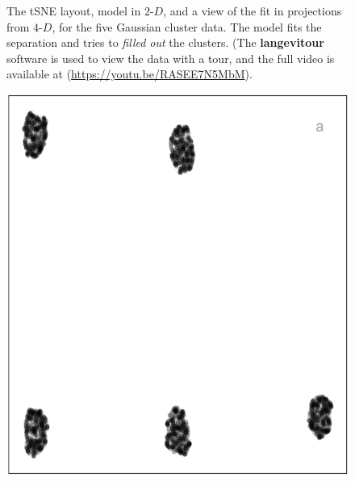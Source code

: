 \documentclass[
  12pt]{article}
\newcommand\gD{$2\text{-}D$}
\begin{document}
\begin{figure}[H]
\caption{\label{fig-gau-tsne-sc}The tSNE layout, model in \gD{}, and a
view of the fit in projections from \(4\text{-}D\), for the five
Gaussian cluster data. The model fits the separation and tries to
\emph{filled out} the clusters. (The \textbf{langevitour} software is
used to view the data with a tour, and the full video is available at
(\url{https://youtu.be/RASEE7N5MbM}).}

\end{figure}%

\begin{figure}[H]

\begin{minipage}{0.33\linewidth}
\includegraphics{figures/five_gau_clusters/umap_layout.png}\end{minipage}%
%
\begin{minipage}{0.33\linewidth}

\end{minipage}
\end{figure}
\end{document}
